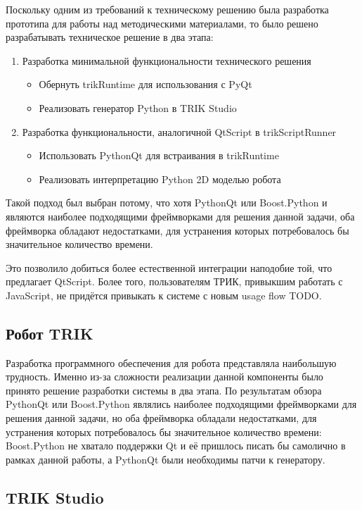 \documentclass[14pt]{matmex-diploma-custom}
\begin{document}
Поскольку одним из требований к техническому решению была разработка прототипа для работы над методическими материалами, то было решено разрабатывать техническое решение в два этапа:
\begin{enumerate}
    \item Разработка минимальной функциональности технического решения
    \begin{itemize}
        \item Обернуть trikRuntime для использования с PyQt
        \item Реализовать генератор Python в TRIK Studio
    \end{itemize}
    \item Разработка функциональности, аналогичной QtScript в trikScriptRunner
    \begin{itemize}
        \item Использовать PythonQt для встраивания в trikRuntime
        \item Реализовать интерпретацию Python 2D моделью робота
    \end{itemize}
\end{enumerate} 

Такой подход был выбран потому, что хотя PythonQt или Boost.Python и являются наиболее подходящими фреймворками для решения данной задачи, оба фреймворка обладают недостатками, для устранения которых потребовалось бы значительное количество времени. 

Это позволило добиться более естественной интеграции наподобие той, что предлагает QtScript. Более того, пользователям ТРИК, привыкшим работать с JavaScript, не придётся привыкать к системе с новым usage flow TODO. 

\subsection{Робот TRIK}
Разработка программного обеспечения для робота представляла наибольшую трудность. Именно из-за сложности реализации данной компоненты было принято решение разработки системы в два этапа. По результатам обзора PythonQt или Boost.Python являлись наиболее подходящими фреймворками для решения данной задачи, но оба фреймворка обладали недостатками, для устранения которых потребовалось бы значительное количество времени: Boost.Python не хватало поддержки Qt и её пришлось писать бы самолично в рамках данной работы, а PythonQt были необходимы патчи к генератору.   

\subsection{TRIK Studio}
\end{document}
